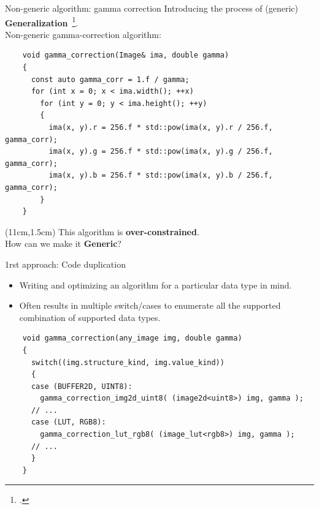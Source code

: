 \documentclass[12pt,aspectratio=169]{beamer}
\begin{document}
\begin{frame}[fragile]{Non-generic algorithm: gamma correction}
  Introducing the process of (generic) \textbf{Generalization}~\footcite{roynard.2019.rrpr}. \\
  Non-generic gamma-correction algorithm:
  \vspace{-0.3cm}
  \begin{verbatim}
    void gamma_correction(Image& ima, double gamma)
    {
      const auto gamma_corr = 1.f / gamma;
      for (int x = 0; x < ima.width(); ++x)
        for (int y = 0; y < ima.height(); ++y)
        {
          ima(x, y).r = 256.f * std::pow(ima(x, y).r / 256.f, gamma_corr);
          ima(x, y).g = 256.f * std::pow(ima(x, y).g / 256.f, gamma_corr);
          ima(x, y).b = 256.f * std::pow(ima(x, y).b / 256.f, gamma_corr);
        }
    }
  \end{verbatim}
  \begin{textblock*}{4cm}(11cm,1.5cm)
    This algorithm is \textbf{over-constrained}. \\
    How can we make it \textbf{Generic}?
  \end{textblock*}
\end{frame}

\begin{frame}[fragile]{1rst approach: Code duplication}
  \begin{itemize}
    \item Writing and optimizing an algorithm for a particular data type in mind.
    \item Often results in multiple switch/cases to enumerate all the supported combination of supported data types.
  \end{itemize}
  \begin{verbatim}
    void gamma_correction(any_image img, double gamma)
    {
      switch((img.structure_kind, img.value_kind)) 
      {
      case (BUFFER2D, UINT8):
        gamma_correction_img2d_uint8( (image2d<uint8>) img, gamma );
      // ...
      case (LUT, RGB8):
        gamma_correction_lut_rgb8( (image_lut<rgb8>) img, gamma );
      // ...
      }
    }
  \end{verbatim}
\end{frame}
\end{document}
